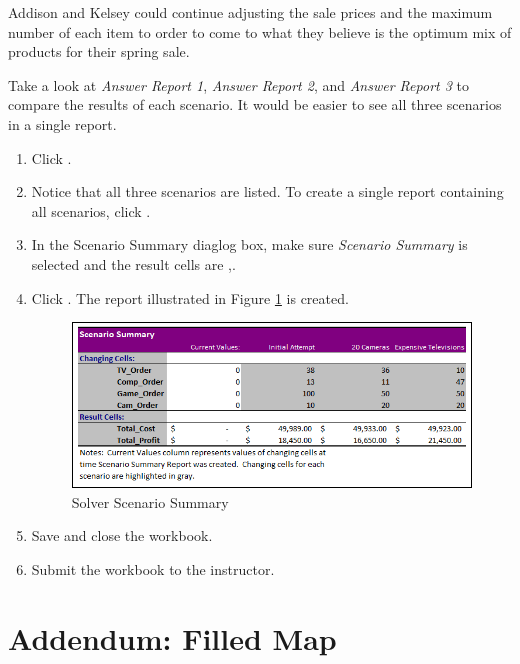 Addison and Kelsey could continue adjusting the sale prices and the maximum number of each item to order to come to what they believe is the optimum mix of products for their spring sale.

Take a look at \textit{Answer Report 1}, \textit{Answer Report 2}, and \textit{Answer Report 3} to compare the results of each scenario. It would be easier to see all three scenarios in a single report.

\begin{enumbox}
	\begin{enumerate}
		\item Click .
		\item Notice that all three scenarios are listed. To create a single report containing all scenarios, click .
		\item In the Scenario Summary diaglog box, make sure \textit{Scenario Summary} is selected and the result cells are ,.
		\item Click . The report illustrated in Figure \ref{08:fig83} is created.
	
		\begin{figure}[H]
			\centering
			\includegraphics[width=\maxwidth{.95\linewidth}]{gfx/ch08_fig83}
			\caption{Solver Scenario Summary}
			\label{08:fig83}
		\end{figure}
		\item Save and close the  workbook.
		\item Submit the  workbook to the instructor.
	\end{enumerate}
\end{enumbox}

\section{Addendum: Filled Map}

